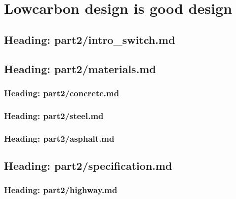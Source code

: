 \documentclass[letterpaper,10pt,english]{jupyterBook}
\begin{document}
\sphinxstepscope


\part{Low\sphinxhyphen{}carbon design is good design}

\sphinxstepscope


\chapter{Heading: part2/intro\_switch.md}
\label{\detokenize{part2/intro_switch:heading-part2-intro-switch-md}}\label{\detokenize{part2/intro_switch::doc}}
\sphinxstepscope


\chapter{Heading: part2/materials.md}
\label{\detokenize{part2/materials:heading-part2-materials-md}}\label{\detokenize{part2/materials::doc}}
\sphinxstepscope


\section{Heading: part2/concrete.md}
\label{\detokenize{part2/concrete:heading-part2-concrete-md}}\label{\detokenize{part2/concrete::doc}}
\sphinxstepscope


\section{Heading: part2/steel.md}
\label{\detokenize{part2/steel:heading-part2-steel-md}}\label{\detokenize{part2/steel::doc}}
\sphinxstepscope


\section{Heading: part2/asphalt.md}
\label{\detokenize{part2/asphalt:heading-part2-asphalt-md}}\label{\detokenize{part2/asphalt::doc}}
\sphinxstepscope


\chapter{Heading: part2/specification.md}
\label{\detokenize{part2/specification:heading-part2-specification-md}}\label{\detokenize{part2/specification::doc}}
\sphinxstepscope


\section{Heading: part2/highway.md}
\label{\detokenize{part2/highway:heading-part2-highway-md}}\label{\detokenize{part2/highway::doc}}
\sphinxstepscope
\end{document}
